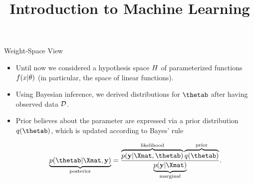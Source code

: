 




\newcommand{\titlefigure}{figure_man/discrete/marginalization-more.png} %
\newcommand{\learninggoals}{
  \item \textcolor{blue}{XXX}
  \item \textcolor{blue}{XXX}
}

\title{Introduction to Machine Learning}
\date{}





\begin{vbframe}{Weight-Space View}

\begin{itemize}
  \item Until now we considered a hypothesis space $H$ of parameterized functions $f(x | \theta)$ (in particular, the space of linear functions). 
  \item Using Bayesian inference, we derived distributions for $\thetab$ after having observed data $\mathcal{D}$. 
  \item Prior believes about the parameter are expressed via a prior distribution $q(\thetab)$, which is updated according to Bayes' rule 

  $$
  \underbrace{p(\thetab | \Xmat, \ydat)}_{\text{posterior}} = \frac{\overbrace{p(\ydat | \Xmat, \thetab)}^{\text{likelihood}}\overbrace{q(\thetab)}^{\text{prior}}}{\underbrace{p(\ydat|\Xmat)}_{\text{marginal}}}. 
  $$
\end{itemize}

\end{vbframe}


